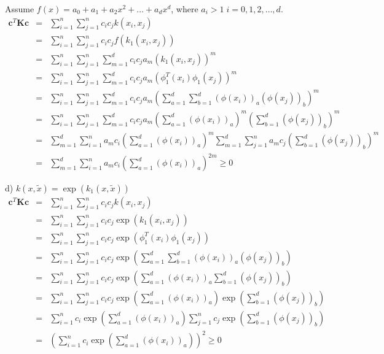 \documentclass[12pt]{article}
\begin{document}
Assume $f(x) = a_0 + a_1 + a_2 x^2 + \dots + a_d x^d$, where $a_i > 1 \; i = 0,1,2,\dots, d$.
\begin{eqnarray*}
  \textbf{c}^T \textbf{Kc}
  &=& \sum_{i=1}^n \sum_{j=1}^n c_i c_j k(x_i,x_j) \\
  &=& \sum_{i=1}^n \sum_{j=1}^n c_i c_j f(k_1(x_i,x_j)) \\
  &=& \sum_{i=1}^n \sum_{j=1}^n \sum_{m = 1}^d c_i c_j a_m
  \left( k_1(x_i,x_j) \right)^m \\
  &=& \sum_{i=1}^n \sum_{j=1}^n \sum_{m = 1}^d c_i c_j a_m
  \left( \phi_1^T(x_i) \phi_1(x_j) \right)^m \\
  &=& \sum_{i=1}^n \sum_{j=1}^n \sum_{m = 1}^d c_i c_j a_m
  \left( \sum_{a=1}^d \sum_{b=1}^d (\phi(x_i))_a (\phi(x_j))_b \right)^m \\
  &=& \sum_{i=1}^n \sum_{j=1}^n \sum_{m = 1}^d c_i c_j a_m
  \left( \sum_{a=1}^d (\phi(x_i))_a \right)^m
  \left(\sum_{b=1}^d (\phi(x_j))_b \right)^m \\
  &=& 
  \sum_{m = 1}^d \sum_{i=1}^n a_m c_i \left( \sum_{a=1}^d (\phi(x_i))_a \right)^m
  \sum_{m = 1}^d \sum_{j=1}^n a_m c_j \left( \sum_{b=1}^d (\phi(x_j))_b \right)^m
  \\
  &=& \sum_{m = 1}^d \sum_{i=1}^n a_m c_i
  \left( \sum_{a=1}^d (\phi(x_i))_a \right)^{2m} \ge 0
\end{eqnarray*}

d) $k(x, \tilde{x}) = \exp (k_1(x, \tilde{x}))$ \\

\begin{eqnarray*}
  \textbf{c}^T \textbf{Kc}
  &=& \sum_{i=1}^n \sum_{j=1}^n c_i c_j k(x_i,x_j) \\
  &=& \sum_{i=1}^n \sum_{j=1}^n c_i c_j \exp (k_1(x_i,x_j)) \\
  &=& \sum_{i=1}^n \sum_{j=1}^n c_i c_j \exp (\phi_1^T(x_i) \phi_1(x_j)) \\
  &=& \sum_{i=1}^n \sum_{j=1}^n c_i c_j
  \exp \left( \sum_{a=1}^d \sum_{b=1}^d (\phi(x_i))_a (\phi(x_j))_b \right) \\
  &=& \sum_{i=1}^n \sum_{j=1}^n c_i c_j
  \exp \left( \sum_{a=1}^d (\phi(x_i))_a \sum_{b=1}^d (\phi(x_j))_b \right) \\
  &=& \sum_{i=1}^n \sum_{j=1}^n c_i c_j
  \exp \left( \sum_{a=1}^d (\phi(x_i))_a \right)
  \exp \left( \sum_{b=1}^d (\phi(x_j))_b \right) \\
  &=& \sum_{i=1}^n c_i \exp \left( \sum_{a=1}^d (\phi(x_i))_a \right)
  \sum_{j=1}^n c_j \exp \left( \sum_{b=1}^d (\phi(x_j))_b \right) \\
  &=& \left( \sum_{i=1}^n c_i 
    \exp \left( \sum_{a=1}^d (\phi(x_i))_a \right) \right)^2 \ge 0
\end{eqnarray*}
\end{document}
